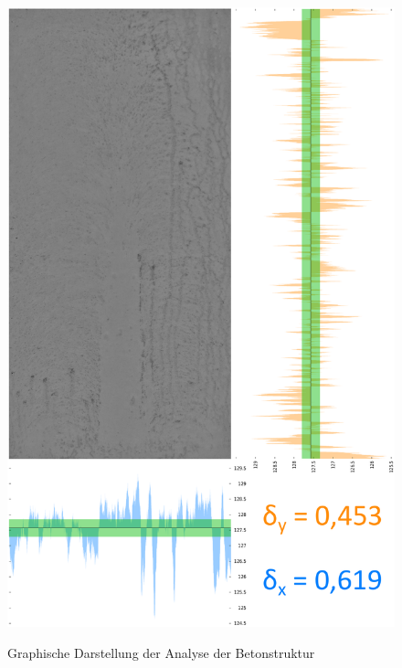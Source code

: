 \documentclass{article}
\begin{document}
\begin{figure}[h!]
{		\includegraphics[height=0.45\textheight]{pictures/bspSchlecht.pdf}
		\label{pic:raster_grau}
	}
	\caption{Graphische Darstellung der Analyse der Betonstruktur}
\end{figure}
\end{document}
